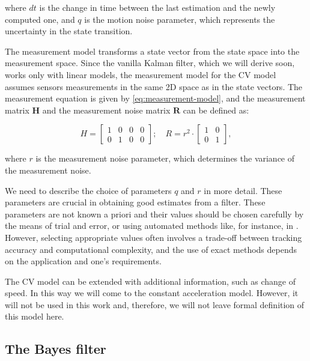 where $dt$ is the change in time between the last estimation and the newly computed one, and $q$ is the motion noise parameter, which represents the uncertainty in the state transition.

The measurement model transforms a state vector from the state space into the measurement space. Since the vanilla Kalman filter, which we will derive soon, works only with linear models, the measurement model for the CV model assumes sensors measurements in the same 2D space as in the state vectors. The measurement equation is given by \ref{eq:measurement-model}, and the measurement matrix $\mathbf{H}$ and the measurement noise matrix $\mathbf{R}$ can be defined as:

\begin{equation}
    H =
    \begin{bmatrix}
        1 & 0 &0 & 0 \\
        0 & 1 &0 & 0
    \end{bmatrix};
    \quad
    R =
    r^{2}\cdot
    \begin{bmatrix}
        1 & 0 \\
        0 & 1
    \end{bmatrix},
\end{equation}

where $r$ is the measurement noise parameter, which determines the variance of the measurement noise.

We need to describe the choice of parameters $q$ and $r$ in more detail. These parameters are crucial in obtaining good estimates from a filter. These parameters are not known a priori and their values should be chosen carefully by the means of trial and error, or using automated methods like, for instance, in \cite{bulutProcessMeasurementNoise2011}. However, selecting appropriate values often involves a trade-off between tracking accuracy and computational complexity, and the use of exact methods depends on the application and one's requirements.

The CV model can be extended with additional information, such as change of speed. In this way we will come to the constant acceleration model. However, it will not be used in this work and, therefore, we will not leave formal definition of this model here.

\subsection{The Bayes filter}\label{sec:bayes-filter}

